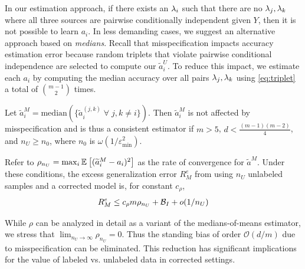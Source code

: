 In our estimation approach, if there exists an $\lambda_i$ such that there are no $\lambda_j, \lambda_k$ where all three sources are pairwise conditionally independent given $Y$, then it is not possible to learn  $a_i$. In less demanding cases, %
we suggest an alternative approach based on \emph{medians}. Recall that misspecification impacts accuracy estimation error because random triplets that violate pairwise conditional independence are selected to compute our $\widetilde{a}_i^U$. To reduce this impact, we estimate each $a_i$ by computing the median accuracy over all pairs $\lambda_j, \lambda_k$ using \eqref{eq:triplet} a total of ${m - 1 \choose 2}$ times.
\begin{proposition}
 Let $\widetilde{a}_i^M = \mathrm{median}(\{\widetilde{a}_i^{(j, k)} \; \forall \; j, k \neq i \})$. Then $\widetilde{a}_i^M$ is not affected by misspecification and is thus a consistent estimator if $m > 5$, $d < \frac{(m - 1)(m - 2)}{4}$, and $n_U \ge n_0$, where $n_0$ is $\omega(1/\varepsilon_{\min}^2)$.

Refer to $\rho_{n_U} = \max_i \mathbb{E}_{}\left[(\widetilde{a}_i^M - a_i)^2\right]$ as the rate of convergence for $\widetilde{a}^M$. Under these conditions, the excess generalization error $R_M^e$ from using $n_U$ unlabeled samples and a corrected model is, for constant $c_\rho$,
\begin{align}
    R_M^{e} \le c_\rho m  \rho_{n_U} + \mathcal{B}_I + o(1/n_U)
\end{align}
\label{prop:medians}
\end{proposition}
\vspace{-2em}
While $\rho$ can be analyzed in detail as a variant of the medians-of-means estimator, we stress that $\lim_{n_U \rightarrow \infty} \rho_{n_U} = 0$. Thus the standing bias of order $\mathcal{O}(d/m)$ due to misspecification can be eliminated. This reduction has significant implications for the value of labeled vs. unlabeled data in corrected settings. %


